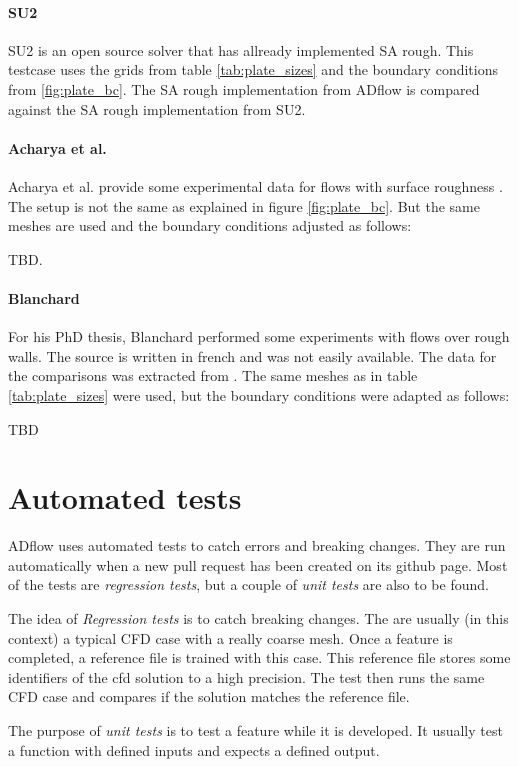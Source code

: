 \paragraph{SU2}
SU2 is an open source solver \cite{su2} that has allready implemented SA rough.
This testcase uses the grids from table \ref{tab:plate_sizes} and the boundary
conditions from \ref{fig:plate_bc}. The SA rough implementation from ADflow is
compared against the SA rough implementation from SU2.

\paragraph{Acharya et al.}
Acharya et al. provide some experimental data for flows with surface roughness
\cite{Acharya1986}. The setup is not the same as explained in figure
\ref{fig:plate_bc}. But the same meshes are used and the boundary conditions
adjusted as follows:

TBD.

\paragraph{Blanchard}
For his PhD thesis, Blanchard performed some experiments with flows over rough
walls. The source is written in french and was not easily available. The data
for the comparisons was extracted from \cite{sa_rough}. The same meshes as in
table \ref{tab:plate_sizes} were used, but the boundary conditions were adapted
as follows:

TBD

\section{Automated tests}
ADflow uses automated tests to catch errors and breaking changes. They are run
automatically when a new pull request has been created on its github page. Most
of the tests are \textit{regression tests}, but a couple of \textit{unit tests}
are also to be found.

The idea of \textit{Regression tests} is to catch breaking changes. The are
usually (in this context) a typical CFD case with a really coarse mesh. Once a
feature is completed, a reference file is trained with this case. This reference
file stores some identifiers of the cfd solution to a high precision. The test
then runs the same CFD case and compares if the solution matches the reference
file.

The purpose of \textit{unit tests} is to test a feature while it is developed.
It usually test a function with defined inputs and expects a defined output.

